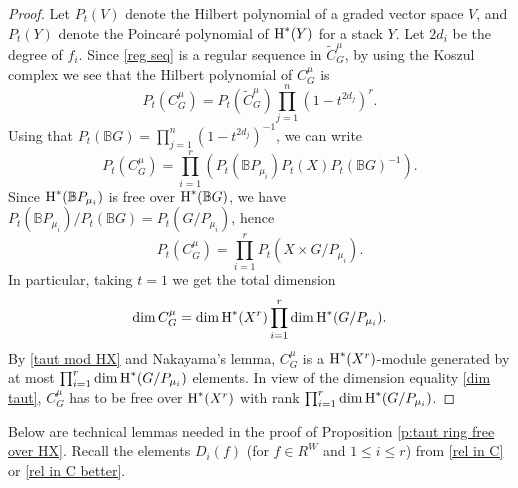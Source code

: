 \documentclass[reqno]{amsart}
\numberwithin{equation}{subsection}
\theoremstyle{definition}
\def\BB{\mathbb{B}}
\newcommand{\wt}[1]{\widetilde{#1}}
\newcommand{\cohog}[2]{\textup{H}^{#1}({#2})}     %
\begin{document}
\begin{proof}
    Let $P_t(V)$ denote the Hilbert polynomial of a graded vector space $V$, and $P_t(Y)$ denote the Poincar\'e polynomial of $\cohog{*}{Y}$ for a stack $Y$. Let $2d_i$ be the degree of $f_i$. Since \eqref{reg seq} is a regular sequence in $\wt C^\mu_G$, by using the Koszul complex we see that the Hilbert polynomial of $C^\mu_G$ is 
    \begin{equation*}
        P_t(C^\mu_G)=P_t(\wt C^\mu_G)\prod_{j=1}^n(1-t^{2d_j})^r.
    \end{equation*}
    Using that $P_t(\BB G)=\prod_{j=1}^n(1-t^{2d_j})^{-1}$, we can write
    \begin{equation*}
        P_t(C^\mu_G)=\prod_{i=1}^r\left(P_t(\BB P_{\mu_i})P_t(X)P_t(\BB G)^{-1}\right).
    \end{equation*}
    Since $\cohog{*}{\BB P_{\mu_i}}$ is free over $\cohog{*}{\BB G}$, we have $P_t(\BB P_{\mu_i})/P_t(\BB G)=P_t(G/P_{\mu_i})$, hence
    \begin{equation*}
        P_t(C^\mu_G)=\prod_{i=1}^rP_t(X\times G/P_{\mu_i}).
    \end{equation*}
    In particular, taking $t=1$ we get the total dimension
    \begin{equation}\label{dim taut}
        \dim C^\mu_G=\dim \cohog{*}{X^r}\prod_{i=1}^r\dim \cohog{*}{G/P_{\mu_i}}.
    \end{equation}
    By \eqref{taut mod HX} and Nakayama's lemma, $C^\mu_G$ is a $\cohog{*}{X^r}$-module generated by at most $\prod_{i=1}^r\dim \cohog{*}{G/P_{\mu_i}}$ elements. In view of the dimension equality \eqref{dim taut}, $C^\mu_G$ has to be free over $\cohog{*}{X^r}$ with rank $\prod_{i=1}^r\dim \cohog{*}{G/P_{\mu_i}}$.
\end{proof}

Below are technical lemmas needed in the proof of Proposition \ref{p:taut ring free over HX}. Recall the elements $D_i(f)$ (for $f\in R^W$ and $1\le i\le r$) from \eqref{rel in C} or \eqref{rel in C better}.
\end{document}
